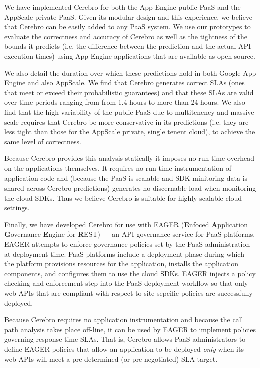 We have implemented Cerebro for both the App Engine public PaaS and 
the AppScale private PaaS. Given its modular design and this experience, 
we believe that Cerebro can be easily added to any PaaS system.
We use our prototypes to evaluate the correctness and accuracy of Cerebro 
as well as the tightness
of the bounds it predicts (i.e. the difference between the prediction and 
the actual API execution times) using App Engine applications
that are available
as open source.  

We also detail the duration over which 
these predictions hold in both Google App Engine and also AppScale.  
We find that Cerebro generates correct SLAs (ones that meet or exceed their
probabilistic guarantees) and that these SLAs are valid over time periods ranging from
from 1.4 hours to more than 24 hours.  
We also find that the high variability of the public PaaS due to multitenency
and massive scale requires that Cerebro be more conservative in its predictions
(i.e. they are less tight than those for the AppScale private, single tenent cloud), 
to achieve the same level of correctness.  

Because Cerebro provides this 
analysis statically it imposes no run-time overhead on the applications
themselves.  It requires no run-time instrumentation of application code and
(because the PaaS is scalable and SDK minitoring data is shared across Cerebro
predictions) generates no discernable load when monitoring
the cloud SDKs.  Thus we believe Cerebro is suitable for highly scalable cloud
settings.

Finally, we have developed Cerebro for use with EAGER (\textbf{E}nfoced
\textbf{A}pplication \textbf{G}overnance \textbf{E}ngine for
\textbf{R}EST)~\cite{XXXeagerXXX} --
an API governance service for PaaS platforms.  EAGER attempts to enforce
governance policies set by the PaaS administration at deployment time.  PaaS
platforms include a deployment phase during which the platform provisions
resources for the application, installs the application components, and
configures them to use the cloud SDKs.  EAGER injects a policy checking and
enforcement step into the PaaS deployment workflow so that only web APIs that
are compliant with respect to site-sepcific policies are successfully deployed. 

Because Cerebro requires no application instrumentation and because the call
path analysis takes place off-line, it can be used by EAGER to implement
policies governing response-time SLAs.  That is, Cerebro allows
PaaS administrators to define
EAGER policies that allow an application to be deployed \textit{only} when its
web APIs will meet a pre-determined (or pre-negotiated) SLA target.

